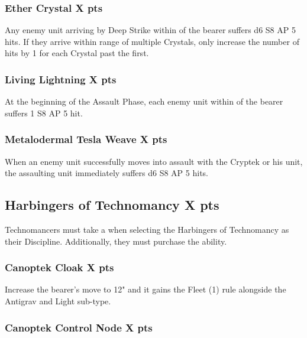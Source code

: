 \subsubsection[Ether Crystal ]{Ether Crystal  \hrulefill X pts}

Any enemy unit arriving by Deep Strike within  of the bearer suffers d6 S8 AP 5 hits. If they arrive within range of multiple Crystals, only increase the number of hits by 1 for each Crystal past the first.

\subsubsection[Living Lightning ]{Living Lightning  \hrulefill X pts}

At the beginning of the Assault Phase, each enemy unit within  of the bearer suffers 1 S8 AP 5 hit.

\subsubsection[Metalodermal Tesla Weave ]{Metalodermal Tesla Weave  \hrulefill X pts}

When an enemy unit successfully moves into assault with the Cryptek or his unit, the assaulting unit immediately suffers d6 S8 AP 5 hits.




\subsection[Harbingers of Technomancy ]{Harbingers of Technomancy  \hrulefill X pts}

Technomancers must take a  when selecting the Harbingers of Technomancy as their Discipline. Additionally, they must purchase the  ability.

\subsubsection[Canoptek Cloak ]{Canoptek Cloak  \hrulefill X pts}

Increase the bearer's move to 12" and it gains the Fleet (1) rule alongside the Antigrav and Light sub-type.

\subsubsection[Canoptek Control Node ]{Canoptek Control Node  \hrulefill X pts}

